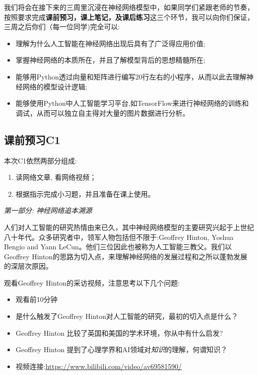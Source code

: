 \documentclass[12pt]{article}
\numberwithin{figure}{section}
\numberwithin{equation}{section}
\begin{document}
我们将会在接下来的三周里沉浸在神经网络模型中，如果同学们紧跟老师的节奏，按照要求完成\textbf{课前预习，课上笔记，及课后练习}这三个环节，我可以向你们保证，三周之后你们（每一位同学)完全可以:
\begin{itemize}
	\item 理解为什么人工智能在神经网络出现后具有了广泛得应用价值;
	\item 掌握神经网络的本质所在，并且了解模型背后的思想精髓所在;
	\item 能够用Python透过向量和矩阵进行编写20行左右的小程序，从而以此去理解神经网络的模型设计逻辑;
	\item 能够使用Python中人工智能学习平台,如TensorFlow来进行神经网络的训练和调试，从而可以独立自主得对大量的图片数据进行分析。
\end{itemize}



\setcounter{section}{3}
\setcounter{subsection}{0}
\subsection{课前预习C1}

本次C1依然两部分组成:
\begin{enumerate}
	\item 读网络文章, 看网络视频；
	\item 根据指示完成小习题，并且准备在课上使用。
\end{enumerate}

\noindent
\textit{第一部分: 神经网络追本溯源}

人们对人工智能的研究热情由来已久，其中神经网络模型的主要研究兴起于上世纪八十年代。众多研究者中，领军人物包括但不限于:Geoffrey Hinton,  Yoshua Bengio and Yann LeCun。他们三位因此也被称为人工智能三教父。我们以Geoffrey Hinton的思路为切入点，来理解神经网络的发展过程和之所以蓬勃发展的深层次原因。

观看Geoffrey Hinton的采访视频，注意思考以下几个问题:
\begin{itemize}
	\item 观看前10分钟
	\item 是什么触发了Geoffrey Hinton对人工智能的研究，最初的切入点是什么？
	\item Geoffrey Hinton 比较了英国和美国的学术环境，你从中有什么启发?
	\item Geoffrey Hinton 提到了心理学界和AI领域对\textit{知识}的理解，何谓知识？
	\item 视频连接:\url{https://www.bilibili.com/video/av69581590/}
\end{itemize}
\end{document}
